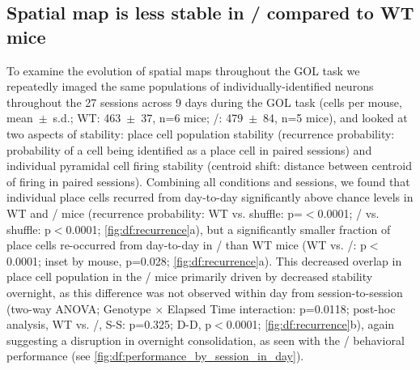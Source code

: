 \subsection{Spatial map is less stable in \df/ compared to WT mice}
\label{sec:df:results:stability}
To examine the evolution of spatial maps throughout the GOL task we repeatedly imaged the same populations of individually-identified neurons throughout the 27 sessions across 9 days during the GOL task (cells per mouse, mean~$\pm$~s.d.; WT: 463~$\pm$~37, n=6 mice; \df/: 479~$\pm$~84, n=5 mice), and looked at two aspects of stability: place cell population stability (recurrence probability: probability of a cell being identified as a place cell in paired sessions) and individual pyramidal cell firing stability (centroid shift: distance between centroid of firing in paired sessions). Combining all conditions and sessions, we found that individual place cells recurred \citep{Ziv2013} from day-to-day significantly above chance levels in WT and \df/ mice (recurrence probability: WT vs. shuffle: p=$<$0.0001; \df/ vs. shuffle: p$<$0.0001; \autoref{fig:df:recurrence}a), but a significantly smaller fraction of place cells re-occurred from day-to-day in \df/ than WT mice (WT vs. \df/: p$<$0.0001; inset by mouse, p=0.028; \autoref{fig:df:recurrence}a). This decreased overlap in place cell population in the \df/ mice primarily driven by decreased stability overnight, as this difference was not observed within day from session-to-session (two-way ANOVA; Genotype $\times$ Elapsed Time interaction: p=0.0118; post-hoc analysis, WT vs. \df/, S-S: p=0.325; D-D, p$<$0.0001; \autoref{fig:df:recurrence}b), again suggesting a disruption in overnight consolidation, as seen with the \df/ behavioral performance (see \autoref{fig:df:performance_by_session_in_day}).

